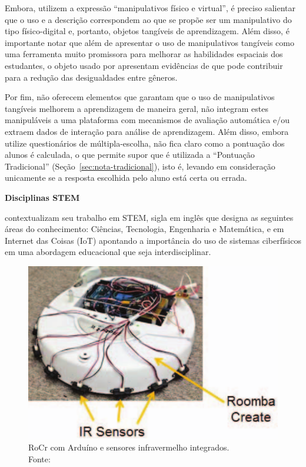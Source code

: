 Embora, \cite{ha:2018} utilizem a expressão ``manipulativos físico e virtual'', é preciso salientar que o uso e a descrição correspondem ao que se propõe ser um manipulativo do tipo físico-digital e, portanto, objetos tangíveis de aprendizagem. Além disso, é importante notar que além de apresentar o uso de manipulativos tangíveis como uma ferramenta muito promissora para melhorar as habilidades espaciais dos estudantes, o objeto usado por \cite{ha:2018} apresentam evidências de que pode contribuir para a redução das desigualdades entre gêneros. 

Por fim, \cite{ha:2018} não oferecem elementos que garantam que o uso de manipulativos tangíveis melhorem a aprendizagem de maneira geral, não integram estes manipuláveis a uma plataforma com mecanismos de avaliação automática e/ou extraem dados de interação para análise de aprendizagem. Além disso, embora utilize questionários de múltipla-escolha, não fica claro como a pontuação dos alunos é calculada, o que permite supor que é utilizada a ``Pontuação Tradicional'' (Seção~\ref{sec:nota-tradicional}), isto é, levando em consideração unicamente se a resposta escolhida pelo aluno está certa ou errada.

\textbf{Disciplinas STEM}

\cite{Azad:2016} contextualizam seu trabalho em STEM, sigla em inglês que designa as seguintes áreas do conhecimento: Ciências, Tecnologia, Engenharia e Matemática, e em Internet das Coisas (IoT) apontando a importância do uso de sistemas ciberfísicos em uma abordagem educacional que seja interdisciplinar.

\begin{figure}[htb]
	\centering
	\includegraphics[width=0.6\linewidth]{chapters/works/azad2016.png}
	\captionsetup{justification=centering}
	\caption{RoCr com Arduíno e sensores infravermelho integrados. \\Fonte:~\cite{Azad:2016}}
	\label{fig:azad2016}
\end{figure}

